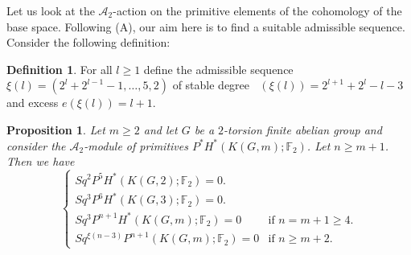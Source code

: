 \documentclass{amsart}
\newtheorem{prop}[thm]{Proposition}
\theoremstyle{definition}
\newtheorem{defn}[thm]{Definition}
\theoremstyle{remark}
\DeclareMathOperator{\degst}{deg_{st}}
\newcommand{\F}{\mathbb{F}}
\newcommand{\A}{\mathcal{A}}
\renewcommand{\geq}{\geqslant}
\begin{document}
Let us look at the $\A_2$-action on the primitive elements of the cohomology of the base space. Following (A), our aim here is to find a suitable admissible sequence. Consider the following definition:

\begin{defn}
For all $l\geq1$ define the admissible sequence $\xi(l)=(2^l+2^{l-1}-1,\dots,5,2)$ of stable degree $\degst(\xi(l))=2^{l+1}+2^l-l-3$ and excess $e(\xi(l))=l+1$.
\end{defn}

\begin{prop}\label{p:action}
Let $m\geq2$ and let $G$ be a $2$-torsion finite abelian group and consider the $\A_2$-module of primitives $P^*H^*(K(G,m);\F_2)$. Let $n\geq m+1$. Then we have
$$
\begin{cases}
Sq^2P^5H^*(K(G,2);\F_2)=0.\\
Sq^3P^6H^*(K(G,3);\F_2)=0.\\
Sq^{3}P^{n+1}H^*(K(G,m);\F_2)=0 &\text{if $n=m+1\geq4$.}\\
Sq^{\xi(n-3)}P^{n+1}(K(G,m);\F_2)=0 &\text{if $n\geq m+2$.}
\end{cases}
$$
\end{prop}
\end{document}
